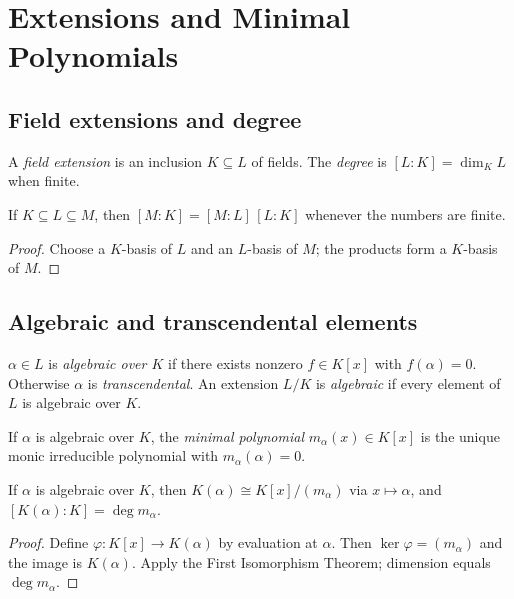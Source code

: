 \section{Extensions and Minimal Polynomials}

\subsection{Field extensions and degree}
\begin{definition}
A \emph{field extension} is an inclusion $K\subseteq L$ of fields. The \emph{degree} is $[L:K]=\dim_K L$ when finite.
\end{definition}

\begin{proposition}
If $K\subseteq L\subseteq M$, then $[M:K]=[M:L]\,[L:K]$ whenever the numbers are finite.
\end{proposition}
\begin{proof}
Choose a $K$-basis of $L$ and an $L$-basis of $M$; the products form a $K$-basis of $M$.
\end{proof}

\subsection{Algebraic and transcendental elements}
\begin{definition}
$\alpha\in L$ is \emph{algebraic over $K$} if there exists nonzero $f\in K[x]$ with $f(\alpha)=0$. Otherwise $\alpha$ is \emph{transcendental}.  
An extension $L/K$ is \emph{algebraic} if every element of $L$ is algebraic over $K$.
\end{definition}

\begin{definition}
If $\alpha$ is algebraic over $K$, the \emph{minimal polynomial} $m_\alpha(x)\in K[x]$ is the unique monic irreducible polynomial with $m_\alpha(\alpha)=0$.
\end{definition}

\begin{theorem}\label{thm:simple}
If $\alpha$ is algebraic over $K$, then $K(\alpha)\cong K[x]/(m_\alpha)$ via $x\mapsto \alpha$, and $[K(\alpha):K]=\deg m_\alpha$.
\end{theorem}
\begin{proof}
Define $\varphi:K[x]\to K(\alpha)$ by evaluation at $\alpha$. Then $\ker\varphi=(m_\alpha)$ and the image is $K(\alpha)$. Apply the First Isomorphism Theorem; dimension equals $\deg m_\alpha$.
\end{proof}

